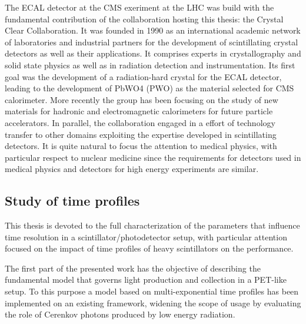 The ECAL detector at the CMS exeriment at the LHC was build with the fundamental contribution of the collaboration hosting this thesis: the Crystal Clear Collaboration. It was founded in 1990 as an international academic network of laboratories and industrial partners for the development of scintillating crystal detectors as well as their applications. It comprises experts in crystallography and solid state physics as well as in radiation detection and instrumentation. 
Its first goal was the development of a radiation-hard crystal for the ECAL detector, leading to the development of PbWO4 (PWO) as the material selected for CMS calorimeter. More recently the group has been focusing on the study of new materials for hadronic and electromagnetic calorimeters for future particle accelerators.
In parallel, the collaboration engaged in a effort of technology transfer to other domains exploiting the expertise developed in scintillating detectors. It is quite natural to focus the attention to medical physics, with particular respect to nuclear medicine since the requirements for detectors used in medical physics and detectors for high energy experiments are similar.


\subsection{Study of time profiles}

This thesis is devoted to the full characterization of the parameters that influence time resolution in a scintillator/photodetector setup, with particular attention focused on the impact of time profiles of heavy scintillators on the performance.

The first part of the presented work has the objective of describing the fundamental model that governs light production and collection in a PET-like setup.
To this purpose a model based on multi-exponential time profiles has been implemented on an existing framework, widening the scope of usage by evaluating the role of Cerenkov photons produced by low energy radiation.

